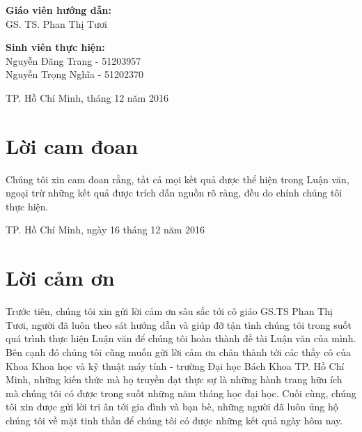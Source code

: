 \documentclass[12pt]{report}
\begin{document}
\begin{titlepage}
\begin{flushright}
\begin{minipage}{0.7\textwidth}

\end{minipage}
\end{flushright}

\begin{flushleft} \large
\textbf{Giáo viên hướng dẫn:}\\
GS. TS. Phan Thị Tươi\\[2.0cm]
\end{flushleft}

\begin{flushleft} \large
\textbf{Sinh viên thực hiện:}\\
Nguyễn Đăng Trang - 51203957\\
Nguyễn Trọng Nghĩa - 51202370\\[2cm]
\end{flushleft}

\begin{flushleft} \large
\centering
TP. Hồ Chí Minh, tháng 12 năm 2016
\end{flushleft}

\vfill %

\end{titlepage}

\newpage
	\chapter*{Lời cam đoan}
		\par Chúng tôi xin cam đoan rằng, tất cả mọi kết quả được thể hiện trong Luận văn, ngoại trừ những kết quả được trích dẫn nguồn rõ ràng, đều do chính chúng tôi thực hiện.

		\begin{flushright}
			TP. Hồ Chí Minh, ngày 16 tháng 12 năm 2016
		\end{flushright}

\newpage
	\chapter*{Lời cảm ơn}
		\par Trước tiên, chúng tôi xin gửi lời cảm ơn sâu sắc tới cô giáo GS.TS Phan Thị Tươi, người đã luôn theo sát hướng dẫn và giúp đỡ tận tình chúng tôi trong suốt quá trình thực hiện Luận văn để chúng tôi hoàn thành đề tài Luận văn của mình. Bên cạnh đó chúng tôi cũng muốn gửi lời cảm ơn chân thành tới các thầy cô của Khoa Khoa học và kỹ thuật máy tính - trường Đại học Bách Khoa TP. Hồ Chí Minh, những kiến thức mà họ truyền đạt thực sự là những hành trang hữu ích mà chúng tôi có được trong suốt những năm tháng học đại học. Cuối cùng, chúng tôi xin được gửi lời tri ân tới gia đình và bạn bè, những người đã luôn ủng hộ chúng tôi về mặt tinh thần để chúng tôi có được những kết quả ngày hôm nay. 
\end{document}
